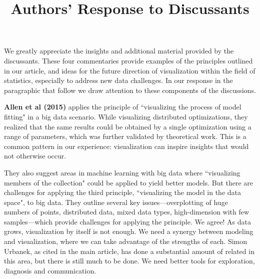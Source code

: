 \documentclass[preprint]{imsart}
\begin{document}
\begin{frontmatter}
\title{Authors' Response to Discussants}
\end{frontmatter}

We greatly appreciate the insights and additional material provided by the discussants. These four commentaries provide examples of the principles outlined in our article, and ideas for the future direction of visualization within the field of statistics, especially to address new data challenges. In our response in the paragraphic that follow we draw attention to these components of the discussions. 


\textbf{Allen et al (2015)} applies the principle of ``visualizing the process of model fitting" in a big data scenario. While visualizing distributed optimizations, they realized that the same results could be obtained by a single optimization using a range of parameters, which was further validated by theoretical work. This is a common pattern in our experience: visualization can inspire insights that would not otherwise occur.

They also suggest areas in machine learning with big data where ``visualizing members of the collection" could be applied to yield better models. But there are challenges for applying the third principle, ``visualizing the model in the data space", to big data. They outline several key issues---overplotting of huge numbers of points, distributed data, mixed data types, high-dimension with few samples---which provide challenges for applying the principle. We agree! As data grows, visualization by itself is not enough. We need a synergy between modeling and visualization, where we can take advantage of the strengths of each. Simon Urbanek, as cited in the main article, has done a substantial  amount of related in this area, but there is still much to be done. We need better tools for exploration, diagnosis and communication.
\end{document}
